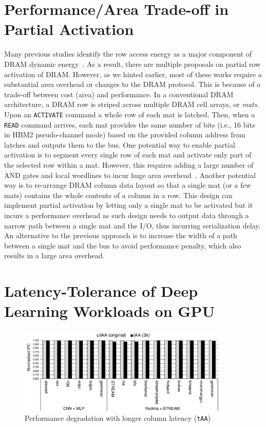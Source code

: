 \section{Performance/Area Trade-off in Partial Activation}
 Many previous studies identify the row access energy as a major component of DRAM dynamic energy~. As a result, there are multiple proposals on partial row activation of DRAM. However, as we hinted earlier, most of these works require a substantial area overhead or changes to the DRAM protocol. This is because of a trade-off between cost (area) and performance. In a conventional DRAM architecture, a DRAM row is striped across multiple DRAM cell arrays, or \emph{mats}. Upon an {\tt ACTIVATE} command a whole row of each mat is latched. Then, when a {\tt READ} command arrives, each mat provides the same number of bits (i.e., 16 bits in HBM2 pseudo-channel mode) based on the provided column address from latches and outputs them to the bus. One potential way to enable partial activation is to segment every single row of each mat and activate only part of the selected row within a mat. However, this requires adding a large number of AND gates and local wordlines to incur huge area overhead~. Another potential way is to re-arrange DRAM column data layout so that a single mat (or a few mats) contains the whole contents of a column in a row. This design can implement partial activation by letting only a single mat to be activated but it incurs a performance overhead as such design needs to output data through a narrow path between a single mat and the I/O, thus incurring serialization delay. An alternative to the previous approach is to increase the width of a path between a single mat and the bus to avoid performance penalty, which also results in a large area overhead.

\section{Latency-Tolerance of Deep Learning Workloads on GPU}
\begin{figure}[t]
	\centering
	    \centering
    	\includegraphics[width=0.90\textwidth]{figure/taa_long.pdf} 
	\caption{Performance degradation with longer column latency ({\tt tAA})}
	\label{fig:ch2:perfhit}
\end{figure}

